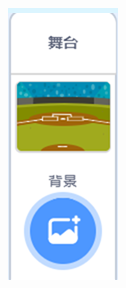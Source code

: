 \documentclass[10pt, a4paper]{article}
\begin{document}
\begin{figure}[htbp]
\begin{minipage}[t]{.23\textwidth}
\begin{minipage}[t]{.23\textwidth}
                \includegraphics[width=\textwidth]{28-1.png}

\end{minipage}
\end{minipage}
\end{figure}
\end{document}
